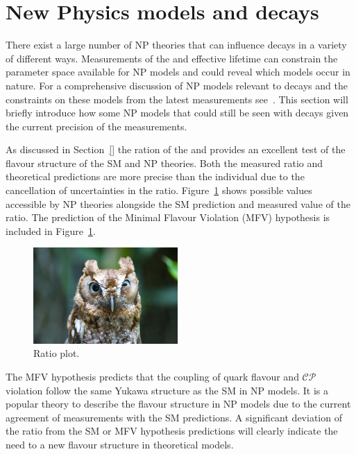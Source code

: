 \section{New Physics models and \bmumu decays}
\label{sec:NPmodels}
There exist a large number of NP theories that can influence \bmumu decays in a variety of different ways. Measurements of the \bmumu \BFs and \bsmumu effective lifetime can constrain the parameter space available for NP models and could reveal which models occur in nature. For a comprehensive discussion of NP models relevant to \bmumu decays and the constraints on these models from the latest \BF measurements see~\cite{}. This section will briefly introduce how some NP models that could still be seen with \bmumu decays given the current precision of the \BF measurements. %

As discussed in Section~\ref{} the ration of the \bdmumu and \bsmumu \Bfs provides an excellent test of the flavour structure of the SM and NP theories. Both the measured ratio and theoretical predictions are more precise than the individual \BFs due to the cancellation of uncertainties in the ratio. Figure~\ref{fig:ratio} shows possible values accessible by NP theories alongside the SM prediction and measured value of the \BF ratio. The prediction of the Minimal Flavour Violation (MFV) hypothesis is included in Figure~\ref{fig:ratio}. 
\begin{figure}[htbp]
    \centering
        \includegraphics[width=0.49\textwidth]{./Figs/placeholder.jpeg}
    \caption{Ratio plot.}
    \label{fig:ratio}
\end{figure}
The MFV hypothesis predicts that the coupling of quark flavour and $\mathcal{CP}$ violation follow the same Yukawa structure as the SM in NP models. It is a popular theory to describe the flavour structure in NP models due to the current agreement of measurements with the SM predictions. A significant deviation of the \BF ratio from the SM or MFV hypothesis predictions will clearly indicate the need to a new flavour structure in theoretical models.

